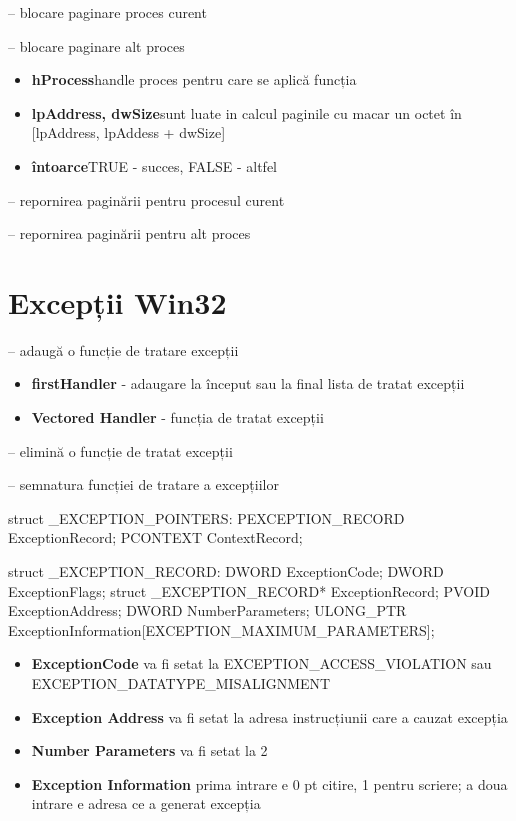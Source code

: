 \documentclass{refcard.cs.pub.ro}
\begin{document}
\begin{multicols*}{3}
 -- blocare paginare proces curent

 -- blocare paginare alt proces
\begin{itemize}
\item \textbf{hProcess}{handle proces pentru care se aplică funcția}
\item \textbf{lpAddress, dwSize}{sunt luate in calcul paginile cu macar
un octet în
[lpAddress, lpAddess + dwSize]}
\item \textbf{întoarce}{TRUE - succes, FALSE - altfel}
\end{itemize}

 -- repornirea paginării pentru procesul curent

 -- repornirea paginării pentru alt proces

\section{Excepții Win32}

 -- adaugă o funcție de tratare excepții
\begin{itemize}
\item \textbf{firstHandler} - adaugare la început sau la final lista de
tratat excepții
\item \textbf{Vectored Handler} - funcția de tratat excepții
\end{itemize}

 -- elimină o funcție de tratat excepții

 -- semnatura funcției de tratare a excepțiilor

struct _EXCEPTION_POINTERS:
PEXCEPTION_RECORD ExceptionRecord;
PCONTEXT ContextRecord;

struct _EXCEPTION_RECORD:
DWORD ExceptionCode;
DWORD ExceptionFlags;
struct _EXCEPTION_RECORD* ExceptionRecord;
PVOID ExceptionAddress;
DWORD NumberParameters;
ULONG_PTR ExceptionInformation[EXCEPTION_MAXIMUM_PARAMETERS];
\begin{itemize}
\item \textbf{ExceptionCode}{ va fi setat la EXCEPTION_ACCESS_VIOLATION sau
EXCEPTION_DATATYPE_MISALIGNMENT}
\item \textbf{Exception Address}{ va fi setat la adresa instrucțiunii care a cauzat excepția}
\item \textbf{Number Parameters}{ va fi setat la 2}
\item \textbf{Exception Information}{ prima intrare e 0 pt citire, 1 pentru scriere; a
doua intrare e adresa ce a generat excepția}
\end{itemize}

\end{multicols*}
\end{document}

